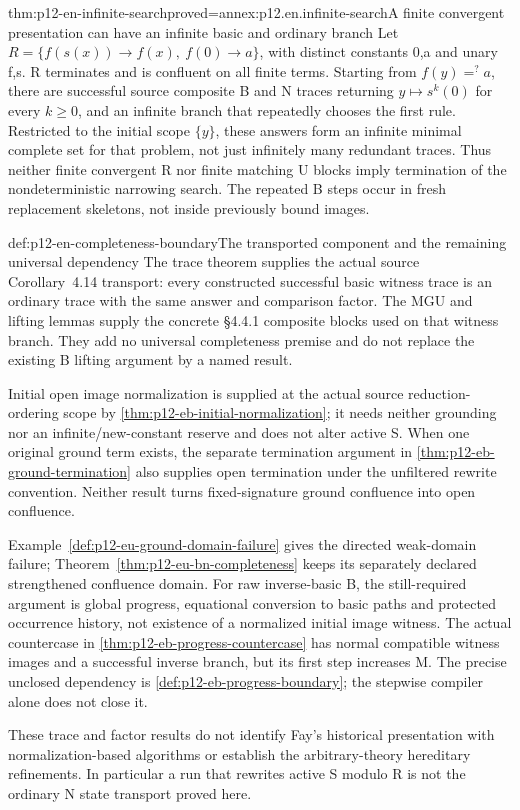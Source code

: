 \begin{hbtheorem}{thm:p12-en-infinite-search}{proved=annex:p12.en.infinite-search}{A finite convergent presentation can have an infinite basic and ordinary branch}
Let \(R=\{f(s(x))\to f(x),\ f(0)\to a\}\), with distinct
constants 0,a and unary f,s. R terminates and is confluent on all
finite terms. Starting from \(f(y)=^{?}a\), there are successful
source composite B and N traces returning \(y\mapsto s^k(0)\)
for every \(k\geq0\), and an infinite branch that repeatedly
chooses the first rule. Restricted to the initial scope \(\{y\}\),
these answers form an infinite minimal complete set for that problem,
not just infinitely many redundant traces. Thus neither finite convergent R nor finite
matching U blocks imply termination of the nondeterministic narrowing
search. The repeated B steps occur in fresh replacement skeletons,
not inside previously bound images.
\end{hbtheorem}

\begin{proofboundary}{def:p12-en-completeness-boundary}{The transported component and the remaining universal dependency}
The trace theorem supplies the actual source Corollary~4.14 transport:
every constructed successful basic witness trace is an ordinary trace
with the same answer and comparison factor. The MGU and lifting
lemmas supply the concrete \S4.4.1 composite blocks used on that
witness branch. They add no universal completeness premise and
do not replace the existing B lifting argument by a named result.

Initial open image normalization is supplied at the actual source
reduction-ordering scope by
\cref{thm:p12-eb-initial-normalization}; it needs neither grounding
nor an infinite/new-constant reserve and does not alter active S.
When one original ground term exists, the separate termination
argument in \cref{thm:p12-eb-ground-termination} also supplies open
termination under the unfiltered rewrite convention. Neither result
turns fixed-signature ground confluence into open confluence.

Example~\ref{def:p12-eu-ground-domain-failure} gives the directed
weak-domain failure; Theorem~\ref{thm:p12-eu-bn-completeness} keeps
its separately declared strengthened confluence domain. For raw
inverse-basic B, the still-required argument is global progress,
equational conversion to basic paths and protected occurrence history,
not existence of a normalized initial image witness. The actual
countercase in \cref{thm:p12-eb-progress-countercase} has normal
compatible witness images and a successful inverse branch, but its
first step increases M. The precise unclosed dependency is
\cref{def:p12-eb-progress-boundary}; the stepwise compiler alone
does not close it.

These trace and factor results do not identify Fay's historical
presentation with normalization-based algorithms or establish the
arbitrary-theory hereditary refinements. In particular a run that
rewrites active S modulo R is not the ordinary N state transport
proved here.
\cite[Theorem4.13, Corollary4.14 and \S4.4.1, pp.~497--499]{BaaderSnyder2001}
\end{proofboundary}
